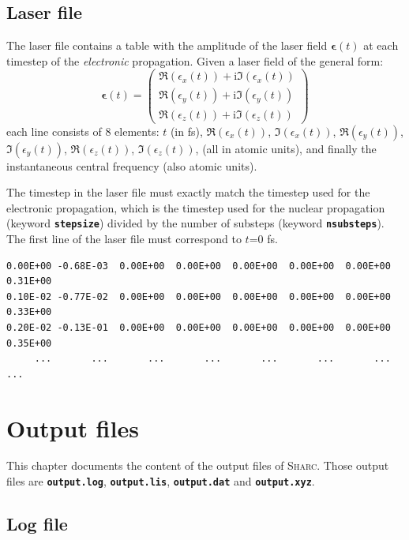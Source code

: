 \documentclass[a4paper,11pt,DIV=15,openany,twoside=false]{scrbook}
\newcommand{\sharc}{\textsc{Sharc}}
\newcommand{\ttt}[1]{\textbf{\texttt{#1}}}
\newcommand{\I}{\ensuremath{\mathrm{i}}}
\newenvironment{example}{
  \vspace{0mm}
  \definecolor{shadecolor}{HTML}{E4F4FF}
  \begin{shaded}
}{
  \end{shaded}
}
\begin{document}
\section{Laser file}\label{sec:laserfile}

The laser file contains a table with the amplitude of the laser field $\boldsymbol{\epsilon}(t)$ at each timestep of the \textit{electronic} propagation. Given a laser field of the general form:
\begin{equation}
  \boldsymbol{\epsilon}(t)=
  \begin{pmatrix}
    \Re(\epsilon_x(t))+\I \Im(\epsilon_x(t))\\
    \Re(\epsilon_y(t))+\I \Im(\epsilon_y(t))\\
    \Re(\epsilon_z(t))+\I \Im(\epsilon_z(t))
  \end{pmatrix}
\end{equation}
each line consists of 8 elements: $t$ (in fs), $\Re(\epsilon_x(t))$, $\Im(\epsilon_x(t))$, $\Re(\epsilon_y(t))$, $\Im(\epsilon_y(t))$, $\Re(\epsilon_z(t))$, $\Im(\epsilon_z(t))$, (all in atomic units), and finally the instantaneous central frequency (also atomic units).

The timestep in the laser file must exactly match the timestep used for the electronic propagation, which is the timestep used for the nuclear propagation (keyword \ttt{stepsize}) divided by the number of substeps (keyword \ttt{nsubsteps}). The first line of the laser file must correspond to $t$=0 fs.

\begin{example}
\begin{verbatim}
0.00E+00 -0.68E-03  0.00E+00  0.00E+00  0.00E+00  0.00E+00  0.00E+00  0.31E+00
0.10E-02 -0.77E-02  0.00E+00  0.00E+00  0.00E+00  0.00E+00  0.00E+00  0.33E+00
0.20E-02 -0.13E-01  0.00E+00  0.00E+00  0.00E+00  0.00E+00  0.00E+00  0.35E+00
     ...       ...       ...       ...       ...       ...       ...       ...
\end{verbatim}
\end{example}


\chapter{Output files}\label{chap:output}

This chapter documents the content of the output files of \sharc. Those output files are \ttt{output.log}, \ttt{output.lis}, \ttt{output.dat} and \ttt{output.xyz}.

\section{Log file}\label{sec:logfile}
\end{document}
